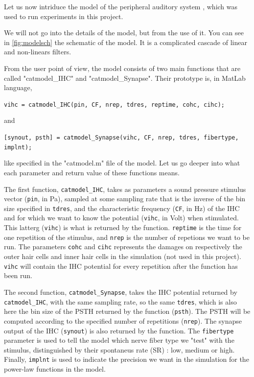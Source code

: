 Let us now intriduce the model of the peripheral auditory system
\cite{Model1, Model2, Model3}, which was used to run experiments in this project. 

We will not go into the details of the model, but from the use of it. 
You can see in \autoref{fig:modelsch} the schematic of the model.
It is a complicated cascade of linear and non-linears filters.



From the user point of view, the model consists of two main functions 
that are called "catmodel\_IHC" and "catmodel\_Synapse".
 Their prototype is, in MatLab language,

\texttt{vihc = catmodel\_IHC(pin, CF, nrep, tdres, reptime, cohc, cihc);}

and

\texttt{[synout, psth] = catmodel\_Synapse(vihc, CF, nrep, tdres, fibertype, implnt);}

like specified in the "catmodel.m" file of the model. 
Let us go deeper into what each parameter and return value of these functions means.

The first function, \texttt{catmodel\_IHC}, takes as parameters 
a sound pressure stimulus vector (\texttt{pin}, in Pa), sampled at some sampling rate 
that is the inverse of the bin size specified in \texttt{tdres}, and 
the characteristic frequency (\texttt{CF}, in Hz) 
of the IHC and for which we want to know the potential 
(\texttt{vihc}, in Volt) when stimulated. 
This latterg (\texttt{vihc}) is what is returned by the function. 
\texttt{reptime} is the time for one repetition of the stimulus, 
and \texttt{nrep} is the number of repetions we want to be run. 
The parameters \texttt{cohc} and \texttt{cihc} represents the damages on respectively 
the outer hair cells and inner hair cells in the simulation (not used in this project).
\texttt{vihc} will contain the IHC potential for every repetition 
after the function has been run.

The second function, \texttt{catmodel\_Synapse}, 
takes the IHC potential returned by \texttt{catmodel\_IHC}, 
with the same sampling rate, so the same \texttt{tdres}, which is also here the bin size
of the PSTH returned by the function (\texttt{psth}). 
The PSTH will be computed according to the specified number of repetitions (\texttt{nrep}).
The synapse output of the IHC (\texttt{synout}) is also returned by the function.
The \texttt{fibertype} parameter is used to tell the model which nerve fiber type
we "test" with the stimulus, distinguished by their spontaneus rate (SR) : 
low, medium or high. 
Finally, \texttt{implnt} is used to indicate the precision we want in the simulation 
for the power-law functions in the model.

